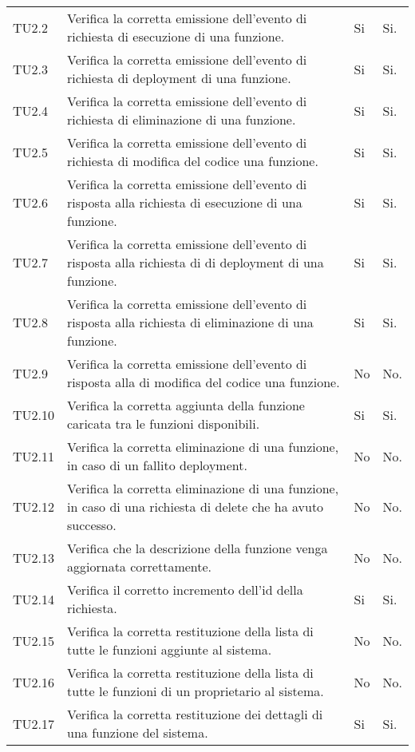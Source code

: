 \begin{longtable}{
		>{\centering}p{}
		>{}p{}
		>{\centering}p{}
		>{\centering}p{} }
TU2.2   &  Verifica la corretta emissione dell'evento di richiesta di esecuzione di una funzione. &
Si & Si. \tabularnewline

TU2.3   &  Verifica la corretta emissione dell'evento di richiesta di deployment di una funzione. &
Si & Si. \tabularnewline

TU2.4   &  Verifica la corretta emissione dell'evento di richiesta di eliminazione di una funzione. &
Si & Si. \tabularnewline

TU2.5   &  Verifica la corretta emissione dell'evento di richiesta di modifica del codice una funzione. &
Si & Si. \tabularnewline

TU2.6   &  Verifica la corretta emissione dell'evento di risposta alla richiesta di esecuzione di una funzione. &
Si & Si. \tabularnewline

TU2.7   &  Verifica la corretta emissione dell'evento di risposta alla richiesta di di deployment di una funzione. &
Si & Si. \tabularnewline

TU2.8   &  Verifica la corretta emissione dell'evento di risposta alla richiesta di eliminazione di una funzione. &
Si & Si. \tabularnewline

TU2.9   &  Verifica la corretta emissione dell'evento di risposta alla di modifica del codice una funzione. &
No & No. \tabularnewline

TU2.10  &  Verifica la corretta aggiunta della funzione caricata tra le funzioni disponibili. &
Si & Si. \tabularnewline

TU2.11  &  Verifica la corretta eliminazione di una funzione, in caso di un fallito deployment. &
No & No. \tabularnewline

TU2.12  &  Verifica la corretta eliminazione di una funzione, in caso di una richiesta di delete che ha avuto successo. &
No & No. \tabularnewline

TU2.13  &  Verifica che la descrizione della funzione venga aggiornata correttamente. &
No & No. \tabularnewline

TU2.14  &  Verifica il corretto incremento dell'id della richiesta. &
Si & Si. \tabularnewline

TU2.15  &  Verifica la corretta restituzione della lista di tutte le funzioni aggiunte al sistema. &
No & No. \tabularnewline

TU2.16  &  Verifica la corretta restituzione della lista di tutte le funzioni di un proprietario al sistema. &
No & No. \tabularnewline

TU2.17  &  Verifica la corretta restituzione dei dettagli di una funzione del sistema. &
Si & Si. \tabularnewline


\end{longtable}
